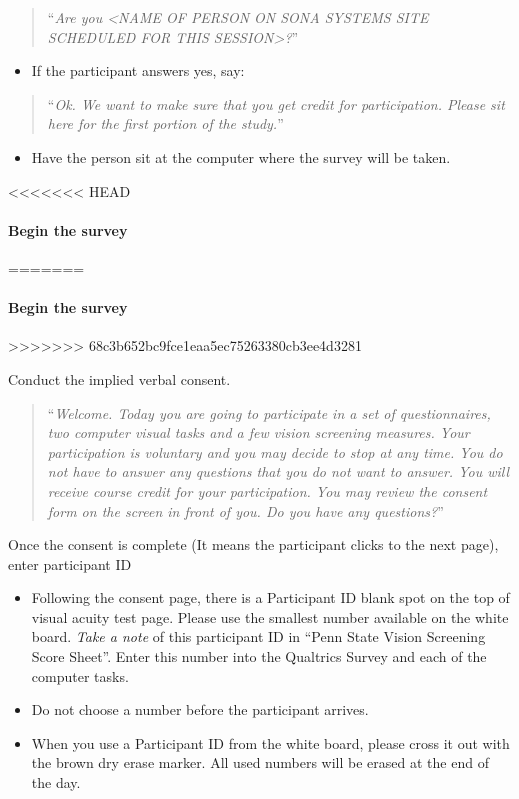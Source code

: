 \documentclass[]{article}
\providecommand{\tightlist}{%
  \setlength{\itemsep}{0pt}\setlength{\parskip}{0pt}}
\let\oldparagraph\paragraph
\renewcommand{\paragraph}[1]{\oldparagraph{#1}\mbox{}}
\begin{document}
\begin{quote}
``\emph{Are you \textless{}NAME OF PERSON ON SONA SYSTEMS SITE SCHEDULED
FOR THIS SESSION\textgreater{}?}''
\end{quote}

\begin{itemize}
\tightlist
\item
  If the participant answers yes, say:
\end{itemize}

\begin{quote}
``\emph{Ok. We want to make sure that you get credit for participation.
Please sit here for the first portion of the study.}''
\end{quote}

\begin{itemize}
\tightlist
\item
  Have the person sit at the computer where the survey will be taken.
\end{itemize}

<<<<<<< HEAD
\paragraph{Begin the survey}\label{begin-the-survey}
=======
\hypertarget{begin-the-survey}{%
\paragraph{Begin the survey}\label{begin-the-survey}}
>>>>>>> 68c3b652bc9fce1eaa5ec75263380cb3ee4d3281

Conduct the implied verbal consent.

\begin{quote}
``\emph{Welcome. Today you are going to participate in a set of
questionnaires, two computer visual tasks and a few vision screening
measures. Your participation is voluntary and you may decide to stop at
any time. You do not have to answer any questions that you do not want
to answer. You will receive course credit for your participation. You
may review the consent form on the screen in front of you. Do you have
any questions?}''
\end{quote}

Once the consent is complete (It means the participant clicks to the
next page), enter participant ID

\begin{itemize}
\item
  Following the consent page, there is a Participant ID blank spot on
  the top of visual acuity test page. Please use the smallest number
  available on the white board. \emph{Take a note} of this participant
  ID in ``Penn State Vision Screening Score Sheet''. Enter this number
  into the Qualtrics Survey and each of the computer tasks.
\item
  Do not choose a number before the participant arrives.
\item
  When you use a Participant ID from the white board, please cross it
  out with the brown dry erase marker. All used numbers will be erased
  at the end of the day.
\end{itemize}
\end{document}
